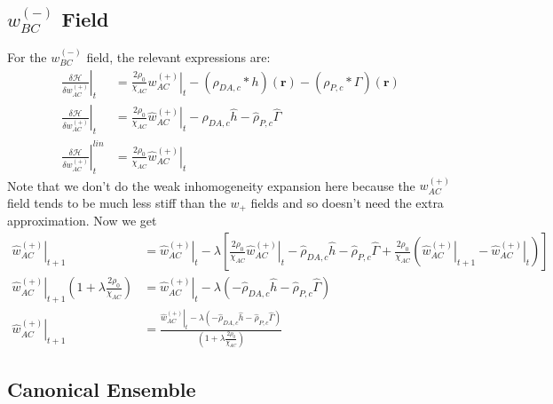 \documentclass{article}
\begin{document}
  \subsection{$w_{BC}^{(-)}$ Field}
  
  For the $w_{BC}^{(-)}$ field, the relevant expressions are:
  \begin{align*}
    \left. \frac{\delta \mathcal{H}}{\delta w_{AC}^{(+)}} \right|_t &=
      \frac{2 \rho_0}{\chi_{AC}} \left. w_{AC}^{(+)} \right|_t
      - (\rho_{DA,c} \ast h)(\mathbf{r})
      - (\rho_{P,c} \ast \Gamma)(\mathbf{r}) \\
    \left. \hat{\frac{\delta \mathcal{H}}{\delta w_{AC}^{(+)}}} \right|_t &=
      \frac{2 \rho_0}{\chi_{AC}} \left. \hat{w}_{AC}^{(+)} \right|_t
      - \hat{\rho}_{DA,c} \hat{h}
      - \hat{\rho}_{P,c}  \hat{\Gamma} \\
    \left.
      \hat{\frac{\delta \mathcal{H}}{\delta w_{AC}^{(+)}}}
    \right| ^{lin}_t &=
      \frac{2\rho_0}{\chi_{AC}} \left. \hat{w}_{AC}^{(+)} \right|_t
  \end{align*}
  Note that we don't do the weak inhomogeneity expansion here because the
    $w_{AC}^{(+)}$ field tends to be much less stiff than the $w_+$ fields and so
    doesn't need the extra approximation.
  Now we get
  \begin{align*}
    \left. \hat{w}_{AC}^{(+)} \right|_{t+1} &=
      \left. \hat{w}_{AC}^{(+)} \right|_t - \lambda \left[
        \frac{2\rho_0}{\chi_{AC}} \left. \hat{w}_{AC}^{(+)} \right|_t
        - \hat{\rho}_{DA,c} \hat{h}
        - \hat{\rho}_{P,c}  \hat{\Gamma}
        + \frac{2\rho_0}{\chi_{AC}}
          ( \left. \hat{w}_{AC}^{(+)}\right|_{t+1}
            - \left. \hat{w}_{AC}^{(+)} \right|_t
          )
      \right] \\
    \left. \hat{w}_{AC}^{(+)} \right|_{t+1} ( 1 + \lambda \frac{2
      \rho_0}{\chi_{AC}} ) &=
      \left. \hat{w}_{AC}^{(+)} \right|_t - \lambda \left(
        - \hat{\rho}_{DA,c} \hat{h}
        - \hat{\rho}_{P,c}  \hat{\Gamma}
      \right) \\
    \left. \hat{w}_{AC}^{(+)} \right|_{t+1} &=
      \frac{
        \left. \hat{w}_{AC}^{(+)} \right|_t - \lambda \left(
          - \hat{\rho}_{DA,c} \hat{h}
          - \hat{\rho}_{P,c}  \hat{\Gamma}
        \right)
      }
      {
        \left( 1 + \lambda \frac{2 \rho_0}{\chi_{AC}} \right)
      }
  \end{align*}
  

  \subsection{Canonical Ensemble}
  
\end{document}
